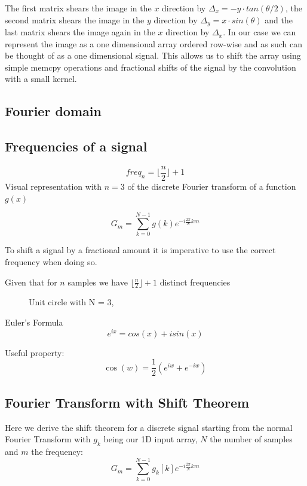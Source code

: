 \documentclass[]{usiinfbachelorproject}
\begin{document}
	The first matrix shears the image in the $x$ direction by $\Delta_x = -y\cdot tan(\theta/2)$, the second matrix shears the image in the $y$ direction by $\Delta_y = x \cdot sin(\theta)$ and the last matrix shears the image again in the $x$ direction by $\Delta_x$.
	In our case we can represent the image as a one dimensional array ordered row-wise and as such can be thought of as a one dimensional signal. This allows us to shift the array using simple memcpy operations and fractional shifts of the signal by the convolution with a small kernel.
	
	\subsection{Fourier domain}
		
	\subsection{Frequencies of a signal}
	\begin{equation}
		freq_{n} = \lfloor \frac{n}{2} \rfloor + 1 \label{freq_equation}
	\end{equation}
	Visual representation with $n=3$ of the discrete Fourier transform of a function $g(x)$
	
	\begin{equation*}
		G_m = \displaystyle\sum_{k=0}^{N-1}g(k)e^{-i \frac{2\pi}{N}km}
	\end{equation*}
	
	To shift a signal by a fractional amount it is imperative to use the correct frequency when doing so.
	
	Given that for $n$ samples we have $\lfloor \frac{n}{2} \rfloor + 1$ distinct frequencies
	
	
	\begin{figure}
		\centering
		
		\caption{Unit circle with N = 3, }
	\end{figure}
	
	Euler's Formula
	\begin{equation}
		e^{ix} = cos(x)  + i sin(x)
	\end{equation}
	
	Useful property:
	\begin{equation}
		\cos(w)= \frac{1}{2}(e^{iw}+ e^{-iw})
	\end{equation}
	
	
	\subsection{Fourier Transform with Shift Theorem}
	Here we derive the shift theorem for a discrete signal starting from the normal Fourier Transform with $g_k$ being our 1D input array, $N$ the number of samples and $m$ the frequency:
	\begin{equation*}
		G_m = \displaystyle\sum_{k=0}^{N-1}g_k[k]e^{-i \frac{2\pi}{N} km}
	\end{equation*}
	
\end{document}

